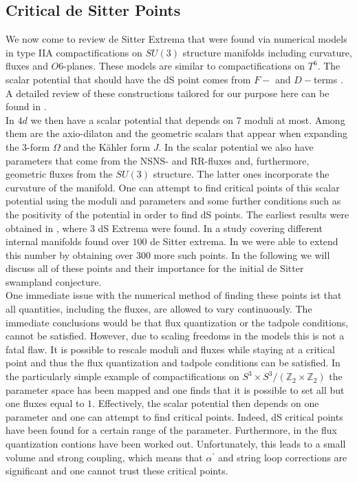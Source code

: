 \documentclass[12pt]{report}
\begin{document}
\subsection{Critical de Sitter Points}
We now come to review de Sitter Extrema that were found via numerical models in type IIA compactifications on $SU(3)$ structure manifolds including curvature, fluxes and $O6$-planes. These models are similar to compactifications on $T^ 6$. The scalar potential that should have the dS point comes from $F-$ and $D-$terms \cite{Grimm:2004ua,Robbins:2007yv}. A detailed review of these constructions tailored for our purpose here can be found in \cite{Danielsson:2011au}.\\
In $4d$ we then have a scalar potential that depends on 7 moduli at most. Among them are the axio-dilaton and the geometric scalars that appear when expanding the 3-form $\Omega$ and the Kähler form $J$. In the scalar potential we also have parameters that come from the NSNS- and RR-fluxes and, furthermore, geometric fluxes from the $SU(3)$ structure. The latter ones incorporate the curvature of the manifold. One can attempt to find critical points of this scalar potential using the moduli and parameters and some further conditions such as the positivity of the potential in order to find dS points. The earliest results were obtained in \cite{Caviezel:2008tf,Flauger:2008ad}, where 3 dS Extrema were found. In \cite{Danielsson:2012et} a study covering different internal manifolds found over $100$ de Sitter extrema. In \cite{Roupec:2018mbn} we were able to extend this number by obtaining over $300$ more such points. In the following we will discuss all of these points and their importance for the initial de Sitter swampland conjecture.\\
One immediate issue with the numerical method of finding these points ist that all quantities, including the fluxes, are allowed to vary continuously. The immediate conclusions would be that flux quantization or the tadpole conditions, cannot be satisfied. However, due to scaling freedoms in the models this is not a fatal flaw. It is possible to rescale moduli and fluxes while staying at a critical point and thus the flux quantization and tadpole conditions can be satisfied. In the particularly simple example of compactifications on $S^ 3 \times S^ 3/(\mathbb{Z}_2 \times \mathbb{Z}_2)$ the parameter space has been mapped and one finds that it is possible to set all but one fluxes equal to $1$. Effectively, the scalar potential then depends on one parameter and one can attempt to find critical points. Indeed, dS critical points have been found \cite{Danielsson:2010bc} for a certain range of the parameter. Furthermore, in \cite{Danielsson:2011au} the flux quantization contions have been worked out. Unfortunately, this leads to a small volume and strong coupling, which means that $\alpha^ \prime$ and string loop corrections are significant and one cannot trust these critical points.\\
\end{document}
